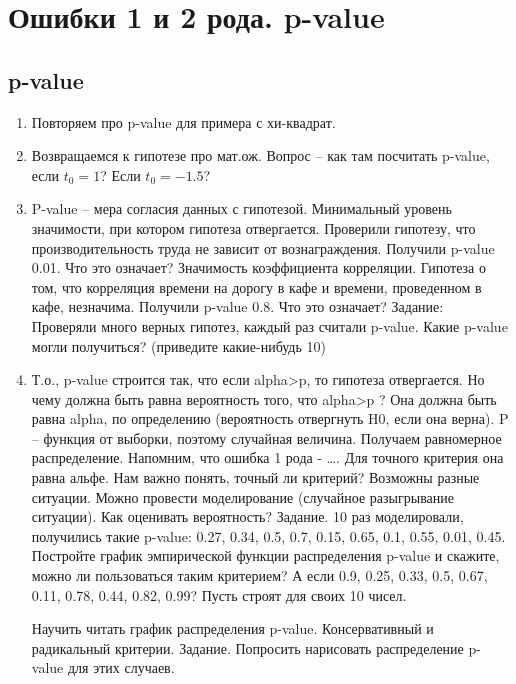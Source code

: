\section{Ошибки 1 и 2 рода. p-value}
\subsection{p-value}
\begin{enumerate}
\item	Повторяем про p-value для примера с хи-квадрат.
\item	Возвращаемся к гипотезе про мат.ож. Вопрос – как там посчитать p-value, если $t_0 = 1$?  Если $t_0 = -1.5$?
\item	 P-value – мера согласия данных с гипотезой. Минимальный уровень значимости, при котором гипотеза отвергается.
Проверили гипотезу, что производительность труда не зависит от вознаграждения. Получили p-value 0.01. Что это означает?
Значимость коэффициента корреляции. Гипотеза о том, что корреляция времени на дорогу в кафе и времени, проведенном в кафе, незначима. Получили p-value 0.8. Что это означает?
Задание: Проверяли много верных гипотез, каждый раз считали p-value. Какие p-value могли получиться? (приведите какие-нибудь 10)
\item	Т.о., p-value строится так, что если alpha>p, то гипотеза отвергается. Но чему должна быть равна вероятность того, что alpha>p ? Она должна быть равна alpha, по определению (вероятность отвергнуть H0, если она верна). P – функция от выборки, поэтому случайная величина. Получаем равномерное распределение.
Напомним, что ошибка 1 рода - ….  Для точного критерия она равна альфе. Нам важно понять, точный ли критерий? Возможны разные ситуации. Можно провести моделирование (случайное разыгрывание ситуации). Как оценивать вероятность?
Задание. 10 раз моделировали, получились такие p-value: 0.27, 0.34, 0.5, 0.7, 0.15, 0.65, 0.1, 0.55, 0.01, 0.45.  Постройте график эмпирической функции распределения p-value и скажите, можно ли пользоваться таким критерием?
А если 0.9, 0.25, 0.33, 0.5, 0.67, 0.11, 0.78, 0.44, 0.82, 0.99?
Пусть строят для своих 10 чисел.

Научить читать график распределения p-value. Консервативный и радикальный критерии.
Задание. Попросить нарисовать распределение p-value для этих случаев.
\end{enumerate}

